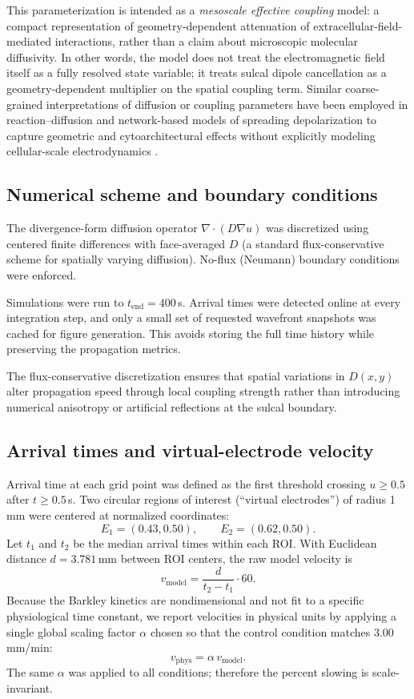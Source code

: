 \documentclass[12pt]{article}
\begin{document}
This parameterization is intended as a \emph{mesoscale effective coupling} model: a compact representation of geometry-dependent attenuation of extracellular-field-mediated interactions, rather than a claim about microscopic molecular diffusivity. In other words, the model does not treat the electromagnetic field itself as a fully resolved state variable; it treats sulcal dipole cancellation as a geometry-dependent multiplier on the spatial coupling term. Similar coarse-grained interpretations of diffusion or coupling parameters have been employed in reaction--diffusion and network-based models of spreading depolarization to capture geometric and cytoarchitectural effects without explicitly modeling cellular-scale electrodynamics \citep{Tuckwell1978,Chapuisat2007,Dahlem2009,Kenny2019}.

\subsection{Numerical scheme and boundary conditions}

The divergence-form diffusion operator $\nabla\cdot(D\nabla u)$ was discretized using centered finite differences with face-averaged $D$ (a standard flux-conservative scheme for spatially varying diffusion). No-flux (Neumann) boundary conditions were enforced.

Simulations were run to $t_{\mathrm{end}}=400$\,s. Arrival times were detected online at every integration step, and only a small set of requested wavefront snapshots was cached for figure generation. This avoids storing the full time history while preserving the propagation metrics.

The flux-conservative discretization ensures that spatial variations in $D(x,y)$ alter propagation speed through local coupling strength rather than introducing numerical anisotropy or artificial reflections at the sulcal boundary.

\subsection{Arrival times and virtual-electrode velocity}

Arrival time at each grid point was defined as the first threshold crossing $u\ge 0.5$ after $t\ge 0.5$\,s. Two circular regions of interest (“virtual electrodes”) of radius 1\,mm were centered at normalized coordinates:
\[
E_1=(0.43,0.50),\qquad E_2=(0.62,0.50).
\]
Let $t_1$ and $t_2$ be the median arrival times within each ROI. With Euclidean distance $d=3.781$\,mm between ROI centers, the raw model velocity is
\[
v_{\mathrm{model}}=\frac{d}{t_2-t_1}\cdot 60.
\]
Because the Barkley kinetics are nondimensional and not fit to a specific physiological time constant, we report velocities in physical units by applying a single global scaling factor $\alpha$ chosen so that the control condition matches 3.00\,mm/min:
\[
v_{\mathrm{phys}}=\alpha\,v_{\mathrm{model}}.
\]
The same $\alpha$ was applied to all conditions; therefore the percent slowing is scale-invariant.
\end{document}
